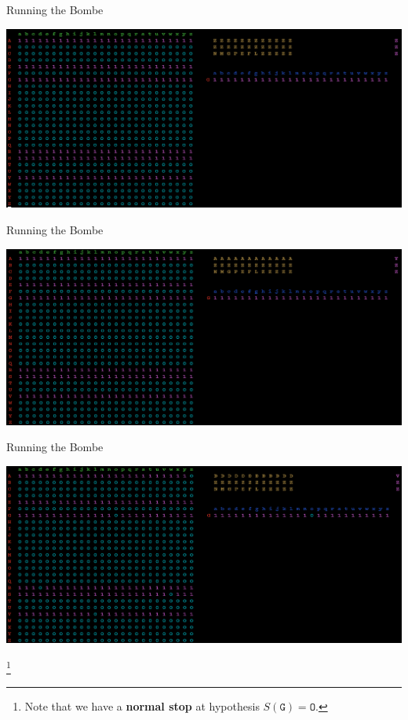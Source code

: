 \documentclass[hyphens,aspectratio=169]{beamer}
\newcommand\blfootnote[1]{%
  \begingroup
  \renewcommand\thefootnote{}\footnote{#1}%
  \addtocounter{footnote}{-1}%
  \endgroup
}
\begin{document}
\begin{frame}{Running the Bombe}
\begin{center}
\includegraphics[scale=0.38]{paper/images/bombe_sim_1.png}
\end{center}
\end{frame}


\begin{frame}{Running the Bombe}
\begin{center}
\includegraphics[scale=0.38]{paper/images/bombe_sim_2.png}
\end{center}
\end{frame}


\begin{frame}{Running the Bombe}
\begin{center}
\includegraphics[scale=0.36]{paper/images/bombe_sim_3.png}
\end{center}
\blfootnote{Note that we have a {\bf{normal stop}} at hypothesis $S(\texttt{G}) = \texttt{O}$.}
\end{frame}
\end{document}
